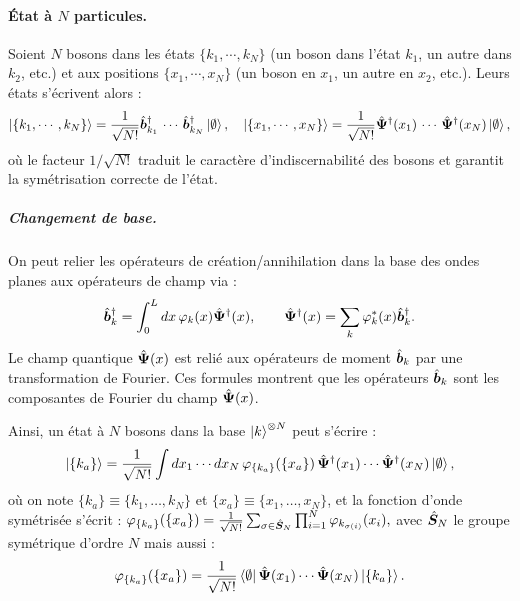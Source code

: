 \paragraph{État à $N$ particules.} Soient $N$ bosons dans les états $\{ k_1 , \cdots , k_N \}$ (un boson dans l’état $k_1$, un autre dans $k_2$, etc.) et aux positions $\{ x_1 , \cdots , x_N \}$ (un boson en $x_1$, un autre en $x_2$, etc.). Leurs états s’écrivent alors :
\begin{eqnarray}
	\ket{ \{ k_1 , \cdots , k_N \}} = \frac{1}{\sqrt{N!}} \hat{\bm{b}}_{k_1}^\dag\, \cdots \, \hat{\bm{b}}_{k_N}^\dag \ket{\emptyset}, \quad \ket{\{x_1 , \cdots , x_N\}} = \frac{1}{\sqrt{N!}} \hat{\bm{\Psi}}^\dag(x_1)\, \cdots \, \hat{\bm{\Psi}}^\dag(x_N) \ket{\emptyset}	, \label{eq.chap.1.ket.N}
\end{eqnarray}
où le facteur \( 1/\sqrt{N!} \) traduit le caractère d’indiscernabilité des bosons et garantit la symétrisation correcte de l’état.

\begin{mdframed}[
	linewidth=0.5pt, 
	backgroundcolor=gray!5, 
	roundcorner=50pt,	
	innerleftmargin=5pt,
    innerrightmargin=5pt,
    innertopmargin=-10pt,
    innerbottommargin=2pt,
    leftmargin=2pt,
    rightmargin=2pt
	]
\subparagraph{Changement de base.}
On peut relier les opérateurs de création/annihilation dans la base des ondes planes aux opérateurs de champ via :
\begin{eqnarray}\label{chap.1:eq.rapel.etat.second.1}
	\hat{\bm{b}}_k^\dagger = \int_0^L dx \, \varphi_k(x) \hat{\bm{\Psi}}^\dagger(x), \qquad 
	\hat{\bm{\Psi}}^\dagger(x) = \sum_k \varphi_k^\ast(x)\hat{\bm{b}}_k^\dagger.\label{eq.chap.1.TF.1}
\end{eqnarray}
Le champ quantique $\hat{\bm{\Psi}}(x)$ est relié aux opérateurs de moment $\hat{\bm{b}}_k$ par une transformation de Fourier. Ces formules montrent que les opérateurs $\hat{\bm{b}}_{k}$ sont les composantes de Fourier du champ $\hat{\bm{\Psi}}(x)$.
\end{mdframed}
Ainsi, un état à \(N\) bosons dans la base \( \ket{k}^{\otimes N} \) peut s’écrire :
\begin{eqnarray}
	\ket{\{k_a\}} = \frac{1}{\sqrt{N!}} \int dx_1 \cdots dx_N \, \varphi_{\{k_a\}} ( \{x_a\} ) \, \hat{\bm{\Psi}}^\dag(x_1) \cdots \hat{\bm{\Psi}}^\dag(x_N) \ket{\emptyset},
\end{eqnarray}
où on note \( \{k_a\} \equiv \{k_1, \dots, k_N\} \) et \( \{x_a\} \equiv \{x_1, \dots, x_N\} \), et la fonction d’onde symétrisée s’écrit :
\(
	\varphi_{\{k_a\}} ( \{x_a\} ) = \frac{1}{\sqrt{N!}} \sum_{\sigma \in \hat{\bm{S}}_N } \prod_{i=1}^N \varphi_{k_{\sigma(i)}}(x_i),
\) 
avec $\hat{\bm{S}}_N $  le groupe symétrique d'ordre $N$ mais aussi :
\begin{eqnarray}
	\varphi_{\{k_a\}} ( \{x_a\}) = \frac{1}{\sqrt{N!}} \bra{\emptyset} \hat{\bm{\Psi}}(x_1) \cdots \hat{\bm{\Psi}}(x_N) \ket{\{k_a\}}.
\end{eqnarray}



